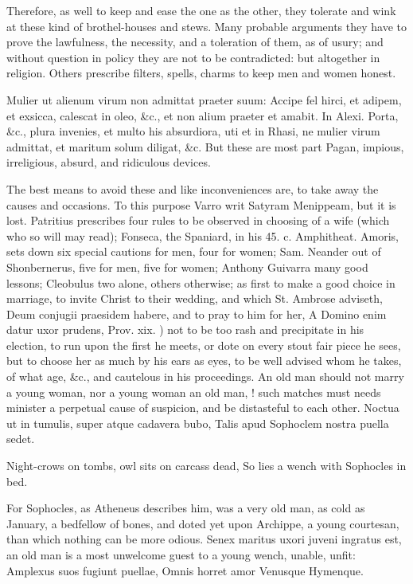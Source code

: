 {Therefore, as well to keep and ease the one as the other, they tolerate
and wink at these kind of brothel-houses and stews. Many probable
arguments they have to prove the lawfulness, the necessity, and a
toleration of them, as of usury; and without question in policy they
are not to be contradicted: but altogether in religion. Others
prescribe filters, spells, charms to keep men and women honest.

Mulier ut alienum virum non admittat praeter suum: Accipe fel
hirci, et adipem, et exsicca, calescat in oleo, \&c., et non alium
praeter et amabit. In Alexi. Porta, \&c., plura invenies, et multo his
absurdiora, uti et in Rhasi, ne mulier virum admittat, et maritum solum
diligat, \&c. But these are most part Pagan, impious, irreligious,
absurd, and ridiculous devices.

The best means to avoid these and like inconveniences are, to take away
the causes and occasions. To this purpose Varro writ Satyram
Menippeam, but it is lost. Patritius prescribes four rules to be
observed in choosing of a wife (which who so will may read); Fonseca,
the Spaniard, in his 45. c. Amphitheat. Amoris, sets down six special
cautions for men, four for women; Sam. Neander out of Shonbernerus,
five for men, five for women; Anthony Guivarra many good lessons;
Cleobulus two alone, others otherwise; as first to make a good
choice in marriage, to invite Christ to their wedding, and which
St. Ambrose adviseth, Deum conjugii praesidem habere, and to pray
to him for her, A Domino enim datur uxor prudens, Prov. xix. ) not to
be too rash and precipitate in his election, to run upon the first he
meets, or dote on every stout fair piece he sees, but to choose her as
much by his ears as eyes, to be well advised whom he takes, of what
age, \&c., and cautelous in his proceedings. An old man should not marry
a young woman, nor a young woman an old man, ! such matches must needs minister a
perpetual cause of suspicion, and be distasteful to each other.
Noctua ut in tumulis, super atque cadavera bubo,
Talis apud Sophoclem nostra puella sedet.

Night-crows on tombs, owl sits on carcass dead,
So lies a wench with Sophocles in bed.

For Sophocles, as Atheneus describes him, was a very old man, as
cold as January, a bedfellow of bones, and doted yet upon Archippe, a
young courtesan, than which nothing can be more odious. Senex
maritus uxori juveni ingratus est, an old man is a most unwelcome guest
to a young wench, unable, unfit:
Amplexus suos fugiunt puellae,
Omnis horret amor Venusque Hymenque.

}
